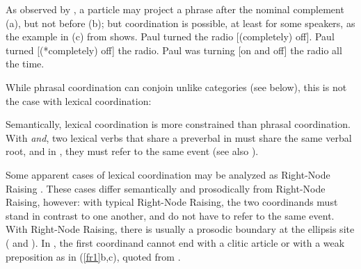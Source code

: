 \eal
{}
\zl

\largerpage
As observed by \citet[--177]{hpsg1}, a particle may project a phrase after the nominal
complement (a), but not before (b); but coordination is possible, at least for some
speakers, as the example in (c) from  shows.
\eal
\ex Paul turned the radio [(completely) off].
\ex Paul turned [(*completely) off] the radio.
\ex Paul was turning [on and off] the radio all the time.
\zl

While phrasal coordination can conjoin unlike categories (see below), this is not the case with lexical coordination:

\eal
{}
\zl

Semantically, lexical coordination is more constrained than phrasal coordination. With \textit{and},
two lexical verbs that share a preverbal  in  must share the same verbal root, and in
, they must refer to the same event (see also \citealt{Bosque1987a-u}).

\eal
{}
\zl

\noindent%
Some apparent cases of lexical coordination may be analyzed as Right-Node Raising
\citep{Beavers}. These cases differ semantically and prosodically from Right-Node Raising, however: with typical Right-Node
Raising, the two coordinands must stand in contrast to one another, and do not have to refer to the
same event. With Right-Node Raising, there is usually a prosodic boundary at the ellipsis site (%
\citealt[843--844]{chavesrnr} and ). In , the first coordinand cannot end with a clitic article or with a weak preposition as in (\ref{fr1}b,c), quoted from \citep[]{Abeille:06}.

